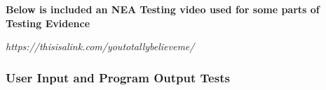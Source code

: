 \pagebreak

\begin{center}
    \large
    \textbf{Below is included an NEA Testing video used for some parts of Testing Evidence}
    
    \vspace{0.2cm}
    
    \Large
    \textit{https://thisisalink.com/youtotallybelieveme/}
\end{center}

\vspace{1cm}
\subsubsection{User Input and Program Output Tests}
\vspace{0.5cm}

